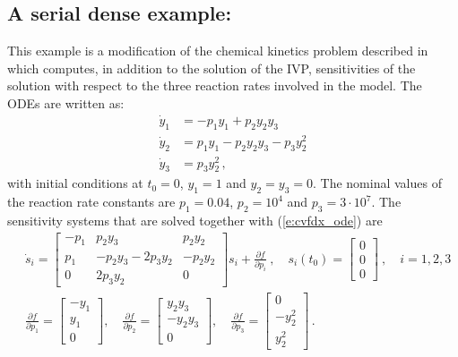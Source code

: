 
\newpage
\subsection{A serial dense example: }
\label{ss:cvfdx}

This example is a modification of the chemical kinetics problem described 
in~\cite{cvode2.2.0_ex} which computes, in addition to the solution of the
IVP, sensitivities of the solution with respect to the three reaction rates 
involved in the model. The ODEs are written as:
\begin{equation}\label{e:cvfdx_ode}
  \begin{split}
    {\dot y}_1 &= -p_1 y_1 + p_2 y_2 y_3   \\
    {\dot y}_2 &=  p_1 y_1 - p_2 y_2 y_3 - p_3 y_2^2 \\
    {\dot y}_3 &=  p_3 y_2^2 \, ,
  \end{split}
\end{equation}
with initial conditions at $t_0 = 0$, $y_1 = 1$ and $y_2 = y_3 = 0$. 
The nominal values of the reaction rate constants are 
$p_1 = 0.04$, $p_2 = 10^4$ and $p_3 = 3\cdot 10^7$.
The sensitivity systems that are solved together with (\ref{e:cvfdx_ode}) are
\begin{equation}\label{e:cvfdx_sens}
  \begin{split}
    & {\dot s}_i = 
    \begin{bmatrix}
      - p_1 &   p_2 y_3             &   p_2 y_2 \\
        p_1 & - p_2 y_3 - 2 p_3 y_2 & - p_2 y_2 \\
        0   &             2 p_3 y_2 &  0              
    \end{bmatrix}
    s_i + \frac{\partial f}{\partial p_i} ~,
    \quad s_i(t_0) = \begin{bmatrix} 0 \\ 0 \\ 0 \end{bmatrix}  ~,
    \quad i = 1,2,3 \\
    & \frac{\partial f}{\partial p_1} = \begin{bmatrix} -y_1 \\ y_1 \\ 0 \end{bmatrix}, \quad
    \frac{\partial f}{\partial p_2} = \begin{bmatrix} y_2 y_3 \\ -y_2 y_3 \\ 0 \end{bmatrix}, \quad
    \frac{\partial f}{\partial p_3} = \begin{bmatrix} 0 \\ - y_2^2 \\ y_2^2 \end{bmatrix} \, .
  \end{split}
\end{equation}

